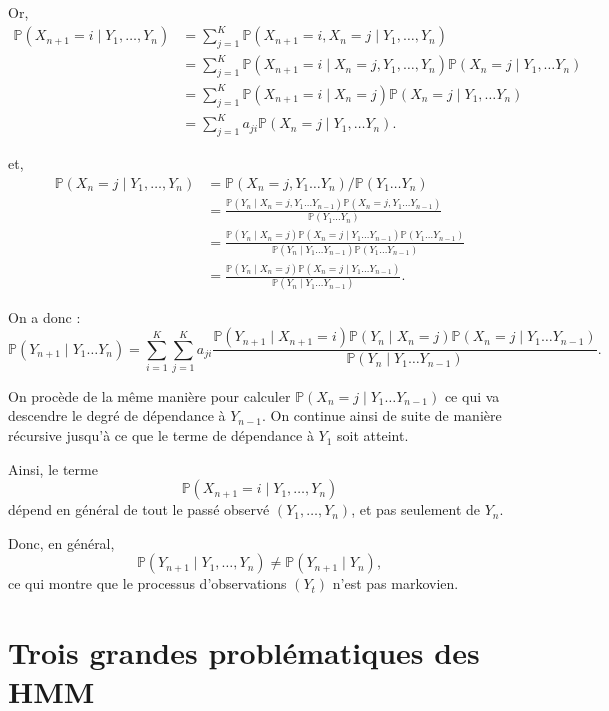 \documentclass[11pt]{article}
\begin{document}
Or, 
\begin{align*}
\mathbb{P}(X_{n+1}=i \mid Y_1,\dots,Y_n)
&= \sum_{j=1}^{K} \mathbb{P}(X_{n+1}=i, X_{n}=j \mid Y_1,\dots,Y_n) \\
&= \sum_{j=1}^{K} \mathbb{P}(X_{n+1}=i \mid X_{n}=j, Y_1,\dots,Y_n) \mathbb{P}(X_{n}=j \mid Y_1, \dots Y_n)\\
&= \sum_{j=1}^{K} \mathbb{P}(X_{n+1}=i \mid X_{n}=j) \mathbb{P}(X_n=j \mid Y_1, \dots Y_n)\\
&= \sum_{j=1}^{K} a_{ji} \mathbb{P}(X_n=j \mid Y_1, \dots Y_n).
\end{align*}

et, 
\begin{align*}
\mathbb{P}(X_{n}=j \mid Y_1,\dots,Y_n) 
&= \mathbb{P}(X_n=j, Y_1 \dots Y_n) / \mathbb{P}(Y_1 \dots Y_n) \\[0.3cm]
&= \frac{\mathbb{P}(Y_n \mid X_n=j,Y_1 \dots Y_{n-1}) \mathbb{P}(X_n=j, Y_1 \dots Y_{n-1})}{\mathbb{P}(Y_1 \dots Y_n)} \\[0.3cm]
&= \frac{\mathbb{P}(Y_n \mid X_n=j) \mathbb{P}(X_n=j \mid Y_1 \dots Y_{n-1}) \mathbb{P}(Y_1 \dots Y_{n-1})}{\mathbb{P}(Y_n \mid Y_1 \dots Y_{n-1}) \mathbb{P}(Y_1 \dots Y_{n-1})}\\[0.3cm]
&= \frac{\mathbb{P}(Y_n \mid X_n=j) \mathbb{P}(X_n=j \mid Y_1 \dots Y_{n-1})}{\mathbb{P}(Y_n \mid Y_1 \dots Y_{n-1})}.
\end{align*}

On a donc : 
\[
\mathbb{P}(Y_{n+1}\mid Y_1 \dots Y_n ) = \sum_{i=1}^{K} \sum_{j=1}^K a_{ji} \frac{\mathbb{P}(Y_{n+1} \mid X_{n+1} = i) \mathbb{P}(Y_n \mid X_n=j) \mathbb{P}(X_n=j \mid Y_1 \dots Y_{n-1})}{\mathbb{P}(Y_n \mid Y_1 \dots Y_{n-1})}.
\]

On procède de la même manière pour calculer $\mathbb{P}(X_n = j \mid Y_1 \dots Y_{n-1})$ ce qui va descendre le degré de dépendance à $Y_{n-1}$. On continue ainsi de suite de manière récursive jusqu'à ce que le terme de dépendance à $Y_1$ soit atteint.

Ainsi, le terme
\[
\mathbb{P}(X_{n+1}=i \mid Y_1,\dots,Y_n)
\]
dépend en général de tout le passé observé $(Y_1,\dots,Y_n)$, et pas seulement de $Y_n$.

Donc, en général,
\[
\mathbb{P}(Y_{n+1} \mid Y_1,\dots,Y_n) \neq \mathbb{P}(Y_{n+1} \mid Y_n),
\]
ce qui montre que le processus d'observations $(Y_t)$ n'est pas markovien.

\newpage

\section{Trois grandes problématiques des HMM}
\end{document}
